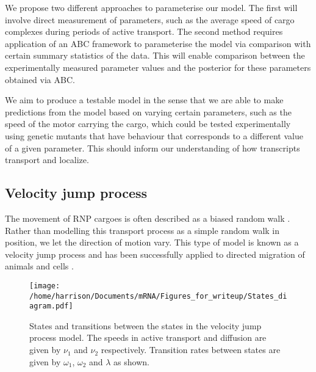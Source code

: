 \documentclass[twocolumn]{biophys}
\begin{document}
We propose two different approaches to parameterise our model. 
The first will involve direct measurement of parameters, such as the average speed of cargo complexes during periods of active transport.
The second method requires application of an ABC framework \citep{johnston2014interpreting, turner2012tutorial, beaumont2002approximate} to parameterise the model via comparison with certain summary statistics of the data.
This will enable comparison between the experimentally measured parameter values and the posterior for these parameters obtained via ABC.

We aim to produce a testable model in the sense that we are able to make predictions from the model based on varying certain parameters, such as the speed of the motor carrying the cargo, which could be tested experimentally using genetic mutants that have behaviour that corresponds to a different value of a given parameter. 
This should inform our understanding of how transcripts transport and localize.

\subsection{Velocity jump process} \label{VJ model}
The movement of RNP cargoes is often described as a biased random walk \citep{zimyanin2008vivo}.
Rather than modelling this transport process as a simple random walk in position, we let the direction of motion vary. 
This type of model is known as a velocity jump process and has been successfully applied to directed migration of animals and cells \citep{codling2005calculating, taylorking2015birds}.

\begin{figure}[h]
 \centering
 \texttt{[image: /home/harrison/Documents/mRNA/Figures\_for\_writeup/States\_diagram.pdf]}
 \caption{States and transitions between the states in the velocity jump process model. The speeds in active transport and diffusion are given by $\nu_1$ and $\nu_2$ respectively. Transition rates between states are given by $\omega_1$, $\omega_2$ and $\lambda$ as shown.}
 \label{FIG:Phases_of_motion}
\end{figure}
\end{document}
